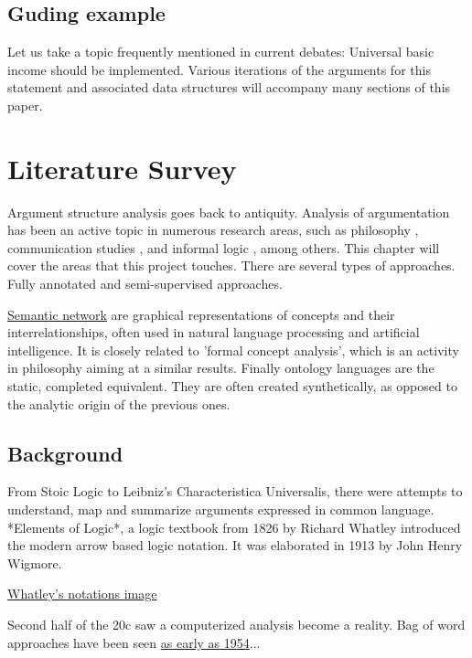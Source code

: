 \documentclass{report}
\begin{document}
\section{Guding example}

Let us take a topic frequently mentioned in current debates: Universal basic income should be implemented.
Various iterations of the arguments for this statement and associated data structures will accompany many sections of this paper.

\newpage

\chapter{Literature Survey}
Argument structure analysis goes back to antiquity. \cite{angelelli_techniques_1970}
Analysis of argumentation has been an active topic in numerous research areas, such as philosophy \cite{van_eemeren_systematic_2003}, communication studies \cite{mercier_why_2011}, and informal logic \cite{blair_informal_2000}, among others. This chapter will cover the areas that this project touches. There are several types of approaches. Fully annotated and semi-supervised approaches.

\href{https://en.wikipedia.org/wiki/Semantic_network}{Semantic network} are graphical representations of concepts and their interrelationships, often used in natural language processing and artificial intelligence. It is closely related to 'formal concept analysis', which is an activity in philosophy aiming at a similar results. Finally ontology languages are the static, completed equivalent. They are often created synthetically, as opposed to the analytic origin of the previous ones.

\section{Background}
From Stoic Logic to Leibniz's Characteristica Universalis, there were attempts to understand, map and summarize arguments expressed in common language. 
\cite{woltzenlogel_paleo_leibnizs_2016}
*Elements of Logic*, a logic textbook from 1826 by Richard Whatley introduced the modern arrow based logic notation. It was elaborated in 1913 by John Henry Wigmore.
\cite{wigmore_principles_1913}

\href{https://commons.wikimedia.org/wiki/File:Whatley.png}{Whatley's notations image}

Second half of the 20c saw a computerized analysis become a reality. Bag of word approaches have been seen \href{https://www.tandfonline.com/doi/abs/10.1080/00437956.1954.11659520}{as early as 1954}...
\cite{harris_distributional_1954}
\end{document}
